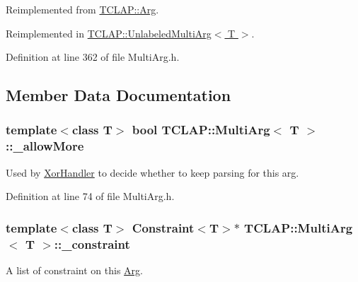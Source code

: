 Reimplemented from \hyperlink{class_t_c_l_a_p_1_1_arg_aef8efaf3811162b2b2b2a84c6db280fa}{T\+C\+L\+A\+P\+::\+Arg}.



Reimplemented in \hyperlink{class_t_c_l_a_p_1_1_unlabeled_multi_arg_a5971af8f29fa4d798ffde3293504c15b}{T\+C\+L\+A\+P\+::\+Unlabeled\+Multi\+Arg$<$ T $>$}.



Definition at line 362 of file Multi\+Arg.\+h.



\subsection{Member Data Documentation}
\hypertarget{class_t_c_l_a_p_1_1_multi_arg_a93a3ef586f763d46839c0e737689b85f}{}
\subsubsection[{\+\_\+allow\+More}]{\setlength{\rightskip}{0pt plus 5cm}template$<$class T$>$ bool {\bf T\+C\+L\+A\+P\+::\+Multi\+Arg}$<$ T $>$\+::\+\_\+allow\+More\hspace{0.3cm}{\ttfamily [protected]}}\label{class_t_c_l_a_p_1_1_multi_arg_a93a3ef586f763d46839c0e737689b85f}
Used by \hyperlink{class_t_c_l_a_p_1_1_xor_handler}{Xor\+Handler} to decide whether to keep parsing for this arg. 

Definition at line 74 of file Multi\+Arg.\+h.

\hypertarget{class_t_c_l_a_p_1_1_multi_arg_afc754048b66bc3a251268947273ea906}{}
\subsubsection[{\+\_\+constraint}]{\setlength{\rightskip}{0pt plus 5cm}template$<$class T$>$ {\bf Constraint}$<$T$>$$\ast$ {\bf T\+C\+L\+A\+P\+::\+Multi\+Arg}$<$ T $>$\+::\+\_\+constraint\hspace{0.3cm}{\ttfamily [protected]}}\label{class_t_c_l_a_p_1_1_multi_arg_afc754048b66bc3a251268947273ea906}
A list of constraint on this \hyperlink{class_t_c_l_a_p_1_1_arg}{Arg}. 

